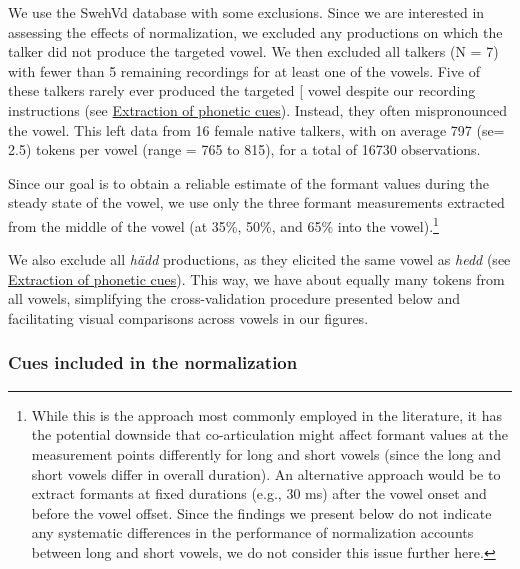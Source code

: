 \documentclass[utf8]{frontiersSCNS}
\begin{document}
We use the SwehVd database with some exclusions. Since we are interested in assessing the effects of normalization, we excluded any productions on which the talker did not produce the targeted vowel. We then excluded all talkers (N = 7) with fewer than 5 remaining recordings for at least one of the vowels. Five of these talkers rarely ever produced the targeted {[}\ipatext{ʊ}{]} vowel despite our recording instructions (see \protect\hyperlink{sec:cue-extraction}{Extraction of phonetic cues}). Instead, they often mispronounced the vowel. This left data from 16 female native talkers, with on average 797 (se= 2.5) tokens per vowel (range = 765 to 815), for a total of 16730 observations.

Since our goal is to obtain a reliable estimate of the formant values during the steady state of the vowel, we use only the three formant measurements extracted from the middle of the vowel (at 35\%, 50\%, and 65\% into the vowel).\footnote{While this is the approach most commonly employed in the literature, it has the potential downside that co-articulation might affect formant values at the measurement points differently for long and short vowels (since the long and short vowels differ in overall duration). An alternative approach would be to extract formants at fixed durations (e.g., 30 ms) after the vowel onset and before the vowel offset. Since the findings we present below do not indicate any systematic differences in the performance of normalization accounts between long and short vowels, we do not consider this issue further here.}

We also exclude all \emph{hädd} productions, as they elicited the same vowel as \emph{hedd} (see \protect\hyperlink{sec:cue-extraction}{Extraction of phonetic cues}). This way, we have about equally many tokens from all vowels, simplifying the cross-validation procedure presented below and facilitating visual comparisons across vowels in our figures.

\hypertarget{sec:cues}{%
\subsubsection*{Cues included in the normalization}\label{sec:cues}}
\end{document}
